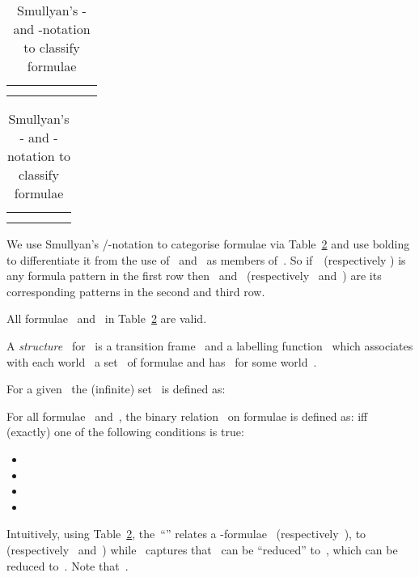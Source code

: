 \documentclass{entcs}
\newcommand{\fean}{}
\begin{document}
\begin{table}[t]
  \caption{Smullyan's - and -notation to classify formulae}
  \label{tab_alphabeta}
  \begin{center}
    \begin{tabular}{|c|c|c|c|c|c|c|}
      \hline
       
      &  
      &  
      &  
      &  
      &  
      &  
      \\ \hline
       
      &  
      &  
      &  
      &  
      &  
      &  
      \\ \hline
      
      & 
      & 
      & 
      & 
      & 
      & 
      \\ \hline
      \end{tabular}
      \begin{tabular}{|c|c|c|c|c|}
      \hline
       
      &  
      &  
      &  
      &  
      \\ \hline
       
      &  
      &  
      &  
      &  
      \\ \hline
      
      & 
      & 
      & 
      & 
      \\ \hline
    \end{tabular}
  \end{center}
\end{table}
We use Smullyan's /-notation to categorise formulae
via Table~\ref{tab_alphabeta}
and use bolding to differentiate it from the use of~ and~ as members of~.
So if~~(respectively ) is any formula pattern in the first row
then~ and~ (respectively~ and~)
are its corresponding patterns in the second and third row.
\begin{proposition}
  \label{prop_axioms}
  All formulae~
  and~ in
  Table~\ref{tab_alphabeta} are valid.
\end{proposition}

\begin{definition}
  A \emph{structure}~ for~
  is a transition frame~
  and a labelling function~ which associates with each world~
  a set~ of formulae and has~ for some world~.
\end{definition}

\begin{definition}
  For a given~
  the (infinite) set~ is defined as:
  
  For all formulae~ and~,
  the binary relation~ on formulae is defined as:
   iff (exactly) one of the following conditions is true:
  \begin{itemize}
  \item 
  \item 
  \item 
  \item 
  \end{itemize}
\end{definition}
Intuitively, using Table~\ref{tab_alphabeta},
the~``'' relates a \fean{}-formulae~ (respectively~),
to~ (respectively~ and~)
while~ captures
that~ can be ``reduced'' to~,
which can be reduced to~.
Note that~.
\end{document}
